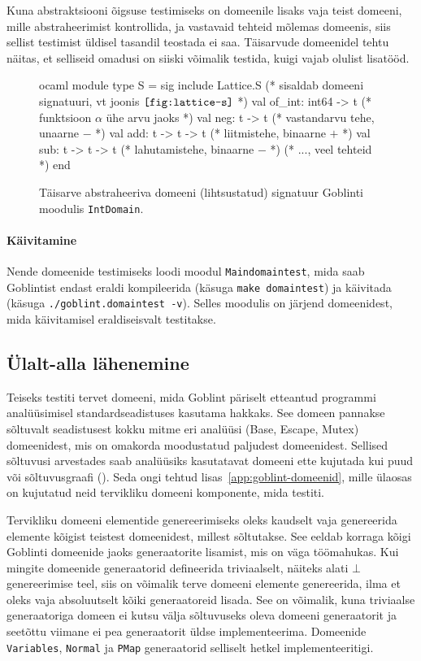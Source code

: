 \documentclass[../thesis.tex]{subfiles}
\begin{document}
Kuna abstraktsiooni õigsuse testimiseks on domeenile lisaks vaja teist domeeni, mille abstraheerimist kontrollida, ja vastavaid tehteid mõlemas domeenis, siis sellist testimist üldisel tasandil teostada ei saa. Täisarvude domeenidel tehtu näitas, et selliseid omadusi on siiski võimalik testida, kuigi vajab olulist lisatööd.

\begin{figure}
	\centering
	\begin{bminted}[mathescape]{ocaml}
		module type S =
		sig
		  include Lattice.S (* sisaldab domeeni signatuuri, vt joonis $\texttt{\ref{fig:lattice-s}}$ *)
		  val of_int: int64 -> t (* funktsioon $\alpha$ ühe arvu jaoks *)
		  val neg: t -> t (* vastandarvu tehe, unaarne $-$ *)
		  val add: t -> t -> t (* liitmistehe, binaarne $+$ *)
		  val sub: t -> t -> t (* lahutamistehe, binaarne $-$ *)
		  (* ..., veel tehteid *)
		end
	\end{bminted}
	\caption{Täisarve abstraheeriva domeeni (lihtsustatud) signatuur Goblinti moodulis \texttt{IntDomain}.}
	\label{fig:intdomain-s}
\end{figure}

\paragraph{Käivitamine}
Nende domeenide testimiseks loodi moodul \texttt{Maindomaintest}, mida saab Goblintist endast eraldi kompileerida (käsuga \texttt{make domaintest}) ja käivitada (käsuga \texttt{./goblint.domaintest -v}). Selles moodulis on järjend domeenidest, mida käivitamisel eraldiseisvalt testitakse.

\subsection{Ülalt-alla lähenemine}
Teiseks testiti tervet domeeni, mida Goblint päriselt etteantud programmi analüüsimisel standardseadistuses kasutama hakkaks. See domeen pannakse sõltuvalt seadistusest kokku mitme eri analüüsi (Base, Escape, Mutex) domeenidest, mis on omakorda moodustatud paljudest domeenidest. Sellised sõltuvusi arvestades saab analüüsiks kasutatavat domeeni ette kujutada kui puud või sõltuvusgraafi (). Seda ongi tehtud lisas~\ref{app:goblint-domeenid}, mille ülaosas on kujutatud neid tervikliku domeeni komponente, mida testiti.

Tervikliku domeeni elementide genereerimiseks oleks kaudselt vaja genereerida elemente kõigist teistest domeenidest, millest sõltutakse. See eeldab korraga kõigi Goblinti domeenide jaoks generaatorite lisamist, mis on väga töömahukas. Kui mingite domeenide generaatorid defineerida triviaalselt, näiteks alati $\bot$ genereerimise teel, siis on võimalik terve domeeni elemente genereerida, ilma et oleks vaja absoluutselt kõiki generaatoreid lisada. See on võimalik, kuna triviaalse generaatoriga domeen ei kutsu välja sõltuvuseks oleva domeeni generaatorit ja seetõttu viimane ei pea generaatorit üldse implementeerima. Domeenide \texttt{Variables}, \texttt{Normal} ja \texttt{PMap} generaatorid selliselt hetkel implementeeritigi.
\end{document}
